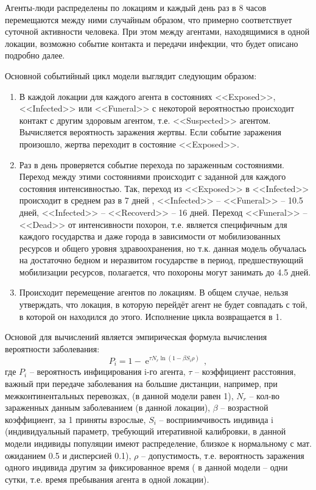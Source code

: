 Агенты-люди распределены по локациям и каждый день раз в 8 часов перемещаются между ними случайным образом, что примерно соответствует суточной активности  человека. При этом между агентами, находящимися в одной локации, возможно событие контакта  и передачи инфекции, что будет описано подробно далее. 

Основной событийный цикл модели выглядит следующим образом:
\begin{enumerate}
	\item В каждой локации для каждого агента в состояниях <<Exposed>>, <<Infected>> или <<Funeral>>  с некоторой вероятностью происходит контакт с другим   здоровым агентом,  т.е. <<Suspected>> агентом. Вычисляется вероятность заражения жертвы. Если событие заражения произошло, жертва переходит в состояние <<Exposed>>.
	\item Раз в день проверяется событие перехода по зараженным состояниями. Переход между этими состояниями происходит с заданной для каждого состояния интенсивностью. Так, переход из <<Exposed>> в <<Infected>> происходит в среднем раз в 7 дней %
	\cite{ncbi:2014} ,  <<Infected>> -- <<Funeral>> -- 10.5 дней, <<Infected>> -- <<Recoverd>> -- 16 дней. Переход <<Funeral>> -- <<Dead>> от интенсивности похорон,  т.е. является специфичным для каждого государства и даже города в зависимости от мобилизованных ресурсов и общего уровня здравоохранения, но  т.к. данная модель обучалась на достаточно бедном и неразвитом государстве в период, предшествующий мобилизации ресурсов, полагается, что похороны могут занимать до 4.5 дней. 
	\item Происходит перемещение агентов по локациям. В общем случае, нельзя утверждать, что локация, в которую перейдёт агент не будет совпадать с той, в которой он находился до этого. Исполнение цикла возвращается в 1. 
\end{enumerate}

Основой для вычислений является эмпирическая формула  вычисления вероятности заболевания:
\begin{equation}\label{stohastic_eq:1}
P_i = 1 - \operatorname{e}^{\tau N_r \ln(1- \beta S_i\rho)} \,,
\end{equation}
где $P_i$ -- вероятность инфицирования  i-го агента, $\tau$  -- коэффициент расстояния, важный при передаче заболевания на большие дистанции, например, при межконтинентальных перевозках, (в данной модели равен 1), $N_r$ -- кол-во зараженных данным заболеванием (в данной локации), $\beta$ -- возрастной коэффициент, за 1 приняты взрослые, $S_i$ -- восприимчивость индивида i (индивидуальный параметр, требующий итеративной калибровки, в данной модели индивиды популяции имеют распределение, близкое к нормальному с мат. ожиданием 0.5 и дисперсией 0.1), $\rho$ -- допустимость,  т.е. вероятность заражения одного индивида другим за фиксированное время ( в данной модели -- одни сутки,  т.е. время пребывания агента в одной локации).

